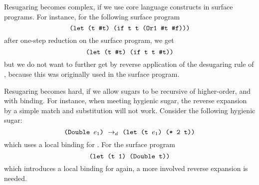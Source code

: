 
Resugaring becomes complex, if we use core language constructs in  surface programs. For instance, for the following surface program
\[
\texttt{(let (t \#t) (if t t (Or1 \#t \#f)))}
\]
after one-step reduction on the surface program, we get
\[
\texttt{(let (t \#t) (if t t \#t))}
\]
but we do not want to further get  by reverse application of the desugaring rule of , because this  was originally used in the surface program.

Resugaring becomes hard, if we allow sugars to be recursive of higher-order, and with binding.
For instance, when meeting hygienic sugar, the reverse expansion by a simple match and substitution will not work. Consider the following hygienic sugar:
\[
\texttt{(Double $e_1$)} ~\rightarrow_d~ \texttt{(let (t $e_1$) (* 2 t))}
\]
which uses a local binding for . For the surface program
\[
\texttt{(let (t 1) (Double t))}
\]
which introduces a local binding for  again, a more involved reverse expansion is needed.

